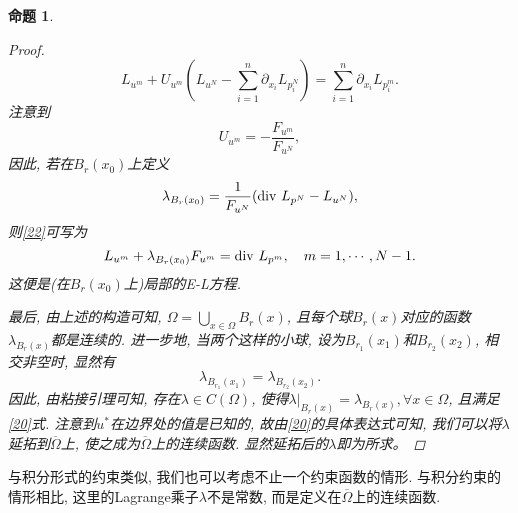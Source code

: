 \documentclass[12pt,a4paper]{article}
\newtheorem{proposition}[theorem]{命题}
\begin{document}
\begin{proposition}
\begin{proof}
\begin{equation}
            L_{u^m} + U_{u^m}\left(L_{u^N} - \sum_{i = 1}^n\partial_{x_i}L_{p_i^N}\right) = \sum_{i = 1}^n\partial_{x_i}L_{p_i^m}.
        \end{equation}
        注意到 
        \begin{equation*}
            U_{u^m} = -\frac{F_{u^m}}{F_{u^N}}, 
        \end{equation*}
        因此, 若在$B_r(x_0)$上定义 
        \begin{equation*}
            \lambda_{B_r(x_0)} = \frac{1}{F_{u^N}}({\rm div}\ L_{p^N} - L_{u^N}),
        \end{equation*}
        则\eqref{22}可写为 
        \begin{equation*}
            L_{u^m} + \lambda_{B_r(x_0)} F_{u^m} = {\rm div}\ L_{p^m}, \quad m = 1, \cdots, N - 1.            
        \end{equation*}
        这便是(在$B_r(x_0)$上)局部的E-L方程.

        最后, 由上述的构造可知, $\Omega = \bigcup_{x \in \Omega}B_r(x)$, 且每个球$B_r(x)$对应的函数$\lambda_{B_r(x)}$都是连续的.
        进一步地, 当两个这样的小球, 设为$B_{r_1}(x_1)$和$B_{r_2}(x_2)$, 相交非空时, 显然有
        \begin{equation*}
            \lambda_{B_{r_1}(x_1)} = \lambda_{B_{r_2}(x_2)}. 
        \end{equation*}
        因此, 由粘接引理可知, 存在$\lambda \in C(\Omega)$, 使得$\lambda|_{B_r(x)} = \lambda_{B_r(x)}, \forall x \in \Omega$, 且满足\eqref{20}式.
        注意到$u^*$在边界处的值是已知的, 故由\eqref{20}的具体表达式可知, 我们可以将$\lambda$延拓到$\overline{\Omega}$上, 使之成为$\overline{\Omega}$上的连续函数.
        显然延拓后的$\lambda$即为所求。
    \end{proof}
\end{proposition}

与积分形式的约束类似, 我们也可以考虑不止一个约束函数的情形. 与积分约束的情形相比, 这里的Lagrange乘子$\lambda$不是常数, 而是定义在$\overline{\Omega}$上的连续函数.
\end{document}
